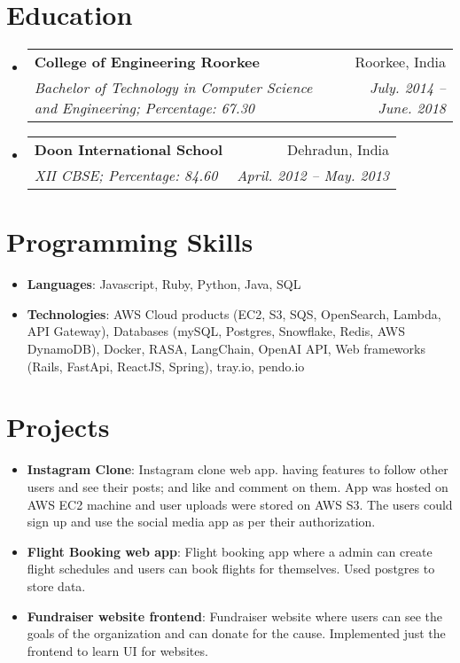 \documentclass[a4paper,11pt]{article}
\makeatletter
\newcommand{\resumeItem}[2]{
  \item\small{
    \textbf{#1}{: #2 \vspace{-2pt}}
  }
}
\newcommand{\resumeSubheading}[4]{
  \vspace{-1pt}\item
    \begin{tabular*}{0.97\textwidth}[t]{l@{\extracolsep{\fill}}r}
      \textbf{#1} & #2 \\
      \textit{\small#3} & \textit{\small #4} \\
    \end{tabular*}\vspace{-5pt}
}
\newcommand{\resumeSubItem}[2]{\resumeItem{#1}{#2}\vspace{-4pt}}
\newcommand{\resumeSubHeadingListStart}{\begin{itemize}[leftmargin=*]}
\newcommand{\resumeSubHeadingListEnd}{\end{itemize}}
\newcommand{\resumeItemListStart}{\begin{itemize}}
\newcommand{\resumeItemListEnd}{\end{itemize}\vspace{-5pt}}
\makeatother
\begin{document}
\section{Education}
  \resumeSubHeadingListStart
    \resumeSubheading
      {College of Engineering Roorkee}{Roorkee, India}
      {Bachelor of Technology in Computer Science and Engineering;  Percentage: 67.30}{July. 2014 -- June. 2018}
    \resumeSubheading
      {Doon International School}{Dehradun, India}
      {XII CBSE;  Percentage: 84.60}{April. 2012 -- May. 2013}
  \resumeSubHeadingListEnd





\section{Programming Skills}
  \resumeItemListStart
    \resumeItem{Languages}
      {Javascript, Ruby, Python, Java, SQL}
    \resumeItem{Technologies}
      {AWS Cloud products (EC2, S3, SQS, OpenSearch, Lambda, API Gateway), Databases (mySQL, Postgres, Snowflake, Redis, AWS DynamoDB), Docker, RASA, LangChain, OpenAI API, Web frameworks (Rails, FastApi, ReactJS, Spring), tray.io, pendo.io}
  \resumeItemListEnd





\section{Projects}
  \resumeSubHeadingListStart
    \resumeSubItem{Instagram Clone}
      {Instagram clone web app. having features to follow other users and see their posts; and like and comment on them. App was hosted on AWS EC2 machine and user uploads were stored on AWS S3. The users could sign up and use the social media app as per their authorization.}
    \resumeSubItem{Flight Booking web app}
      {Flight booking app where a admin can create flight schedules and users can book flights for themselves. Used postgres to store data.}
    \resumeSubItem{Fundraiser website frontend}
      {Fundraiser website where users can see the goals of the organization and can donate for the cause. Implemented just the frontend to learn UI for websites.}
  \resumeSubHeadingListEnd





\end{document}
